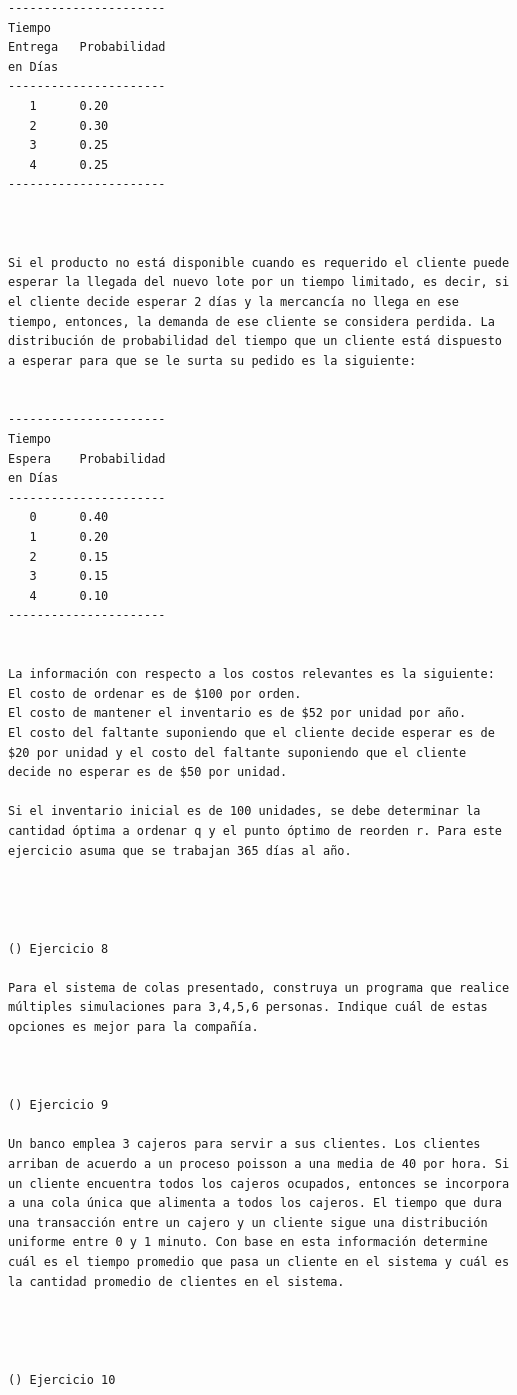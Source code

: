 \begin{verbatim}
----------------------
Tiempo
Entrega   Probabilidad
en Días
----------------------
   1      0.20
   2      0.30
   3      0.25
   4      0.25
----------------------



Si el producto no está disponible cuando es requerido el cliente puede esperar la llegada del nuevo lote por un tiempo limitado, es decir, si el cliente decide esperar 2 días y la mercancía no llega en ese tiempo, entonces, la demanda de ese cliente se considera perdida. La distribución de probabilidad del tiempo que un cliente está dispuesto a esperar para que se le surta su pedido es la siguiente:


----------------------
Tiempo
Espera    Probabilidad
en Días
----------------------
   0      0.40
   1      0.20
   2      0.15
   3      0.15
   4      0.10
----------------------


La información con respecto a los costos relevantes es la siguiente:
El costo de ordenar es de $100 por orden.
El costo de mantener el inventario es de $52 por unidad por año.
El costo del faltante suponiendo que el cliente decide esperar es de $20 por unidad y el costo del faltante suponiendo que el cliente decide no esperar es de $50 por unidad.

Si el inventario inicial es de 100 unidades, se debe determinar la cantidad óptima a ordenar q y el punto óptimo de reorden r. Para este ejercicio asuma que se trabajan 365 días al año.




() Ejercicio 8

Para el sistema de colas presentado, construya un programa que realice múltiples simulaciones para 3,4,5,6 personas. Indique cuál de estas opciones es mejor para la compañía.



() Ejercicio 9

Un banco emplea 3 cajeros para servir a sus clientes. Los clientes arriban de acuerdo a un proceso poisson a una media de 40 por hora. Si un cliente encuentra todos los cajeros ocupados, entonces se incorpora a una cola única que alimenta a todos los cajeros. El tiempo que dura una transacción entre un cajero y un cliente sigue una distribución uniforme entre 0 y 1 minuto. Con base en esta información determine cuál es el tiempo promedio que pasa un cliente en el sistema y cuál es la cantidad promedio de clientes en el sistema.




() Ejercicio 10


\end{verbatim}
